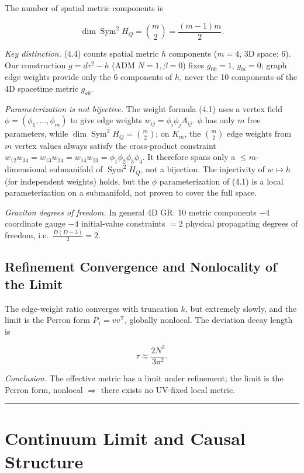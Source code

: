 \documentclass[
  11pt,
]{article}
\begin{document}
The number of spatial metric components is

\[
\dim\operatorname{Sym}^2H_Q=\binom m2=\frac{(m-1)m}{2}.
\tag{4.4}
\]

\emph{Key distinction.} (4.4) counts spatial metric \(h\) components
(\(m=4\), 3D space: 6). Our construction \(g=d\tau^2-h\) (ADM
\(N=1,\beta=0\)) fixes \(g_{00}=1\), \(g_{0i}=0\); graph edge weights
provide only the 6 components of \(h\), never the 10 components of the
4D spacetime metric \(g_{ab}\).

\emph{Parameterization is not bijective.} The weight formula (4.1) uses
a vertex field \(\phi=(\phi_1,\dots,\phi_m)\) to give edge weights
\(w_{ij}=\phi_i\phi_jA_{ij}\). \(\phi\) has only \(m\) free parameters,
while \(\dim\operatorname{Sym}^2H_Q=\binom m2\); on \(K_m\), the
\(\binom m2\) edge weights from \(m\) vertex values always satisfy the
cross-product constraint
\(w_{12}w_{34}=w_{13}w_{24}=w_{14}w_{23}=\phi_1\phi_2\phi_3\phi_4\). It
therefore spans only a \(\le m\)-dimensional submanifold of
\(\operatorname{Sym}^2H_Q\), not a bijection. The injectivity of
\(w\mapsto h\) (for independent weights) holds, but the \(\phi\)
parameterization of (4.1) is a local parameterization on a submanifold,
not proven to cover the full space.

\emph{Graviton degrees of freedom.} In general 4D GR: 10 metric
components \(-4\) coordinate gauge \(-4\) initial-value constraints
\(=2\) physical propagating degrees of freedom,
i.e.~\(\frac{D(D-3)}2=2\).

\subsection{Refinement Convergence and Nonlocality of the
Limit}\label{refinement-convergence-and-nonlocality-of-the-limit}

The edge-weight ratio converges with truncation \(k\), but extremely
slowly, and the limit is the Perron form \(P_1=vv^{\mathsf T}\),
globally nonlocal. The deviation decay length is

\[
\tau\approx\frac{2N^2}{3\pi^2}.
\tag{4.5}
\]

\emph{Conclusion.} The effective metric has a limit under refinement;
the limit is the Perron form, nonlocal \(\Rightarrow\) there exists no
UV-fixed local metric.

\begin{center}\rule{0.5\linewidth}{0.5pt}\end{center}

\section{Continuum Limit and Causal
Structure}\label{continuum-limit-and-causal-structure}
\end{document}
